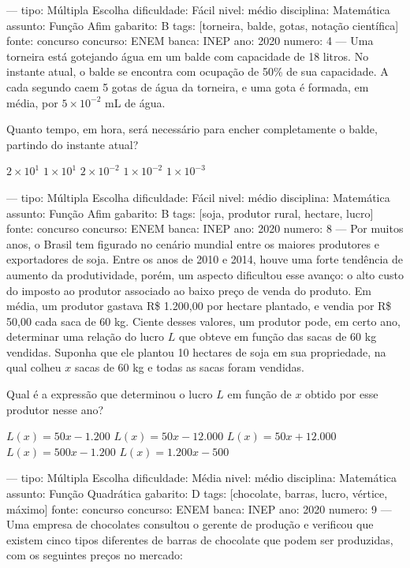 ---
tipo: Múltipla Escolha
dificuldade: Fácil
nivel: médio
disciplina: Matemática
assunto: Função Afim
gabarito: B
tags: [torneira, balde, gotas, notação científica]
fonte: concurso
concurso: ENEM
banca: INEP
ano: 2020
numero: 4
---
\question
Uma torneira está gotejando água em um balde com capacidade de 18 litros. No instante atual, o balde se encontra com ocupação de 50\% de sua capacidade. A cada segundo caem 5 gotas de água da torneira, e uma gota é formada, em média, por \( 5 \times 10^{-2} \) mL de água.

Quanto tempo, em hora, será necessário para encher completamente o balde, partindo do instante atual?
\begin{oneparchoices}
\choice \( 2 \times 10^{1} \)
\correctchoice \( 1 \times 10^{1} \)
\choice \( 2 \times 10^{-2} \)
\choice \( 1 \times 10^{-2} \)
\choice \( 1 \times 10^{-3} \)
\end{oneparchoices}

---
tipo: Múltipla Escolha
dificuldade: Fácil
nivel: médio
disciplina: Matemática
assunto: Função Afim
gabarito: B
tags: [soja, produtor rural, hectare, lucro]
fonte: concurso
concurso: ENEM
banca: INEP
ano: 2020
numero: 8
---
\question
Por muitos anos, o Brasil tem figurado no cenário mundial entre os maiores produtores e exportadores de soja. Entre os anos de 2010 e 2014, houve uma forte tendência de aumento da produtividade, porém, um aspecto dificultou esse avanço: o alto custo do imposto ao produtor associado ao baixo preço de venda do produto. Em média, um produtor gastava R\$ 1.200,00 por hectare plantado, e vendia por R\$ 50,00 cada saca de 60 kg. Ciente desses valores, um produtor pode, em certo ano, determinar uma relação do lucro \( L \) que obteve em função das sacas de 60 kg vendidas. Suponha que ele plantou 10 hectares de soja em sua propriedade, na qual colheu \( x \) sacas de 60 kg e todas as sacas foram vendidas.

Qual é a expressão que determinou o lucro \( L \) em função de \( x \) obtido por esse produtor nesse ano?
\begin{oneparchoices}
\choice \( L(x) = 50x - 1{.}200 \)
\correctchoice \( L(x) = 50x - 12{.}000 \)
\choice \( L(x) = 50x + 12{.}000 \)
\choice \( L(x) = 500x - 1{.}200 \)
\choice \( L(x) = 1{.}200x - 500 \)
\end{oneparchoices}

---
tipo: Múltipla Escolha
dificuldade: Média
nivel: médio
disciplina: Matemática
assunto: Função Quadrática
gabarito: D
tags: [chocolate, barras, lucro, vértice, máximo]
fonte: concurso
concurso: ENEM
banca: INEP
ano: 2020
numero: 9
---
\question
Uma empresa de chocolates consultou o gerente de produção e verificou que existem cinco tipos diferentes de barras de chocolate que podem ser produzidas, com os seguintes preços no mercado:

